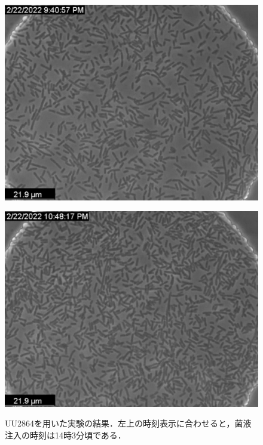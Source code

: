 \documentclass[a4paper,11pt,titlepage]{jsarticle}
\begin{document}
\begin{figure}[htbp]
\begin{minipage}{0.45\linewidth}
    \label{fig:64_2}
  \end{minipage}
  \begin{minipage}{0.45\linewidth}
    \centering
    \includegraphics[width=\columnwidth]{Series007_t080000_RAW_ch00.pdf}
    \label{fig:64_3}
  \end{minipage}
  \begin{minipage}{0.45\linewidth}
    \centering
    \includegraphics[width=\columnwidth]{Series007_t120000_RAW_ch00.pdf}
    \label{fig:64_4}
  \end{minipage}
  \caption{UU2864を用いた実験の結果．左上の時刻表示に合わせると，菌液注入の時刻は14時3分頃である．}
\end{figure}
\end{document}
